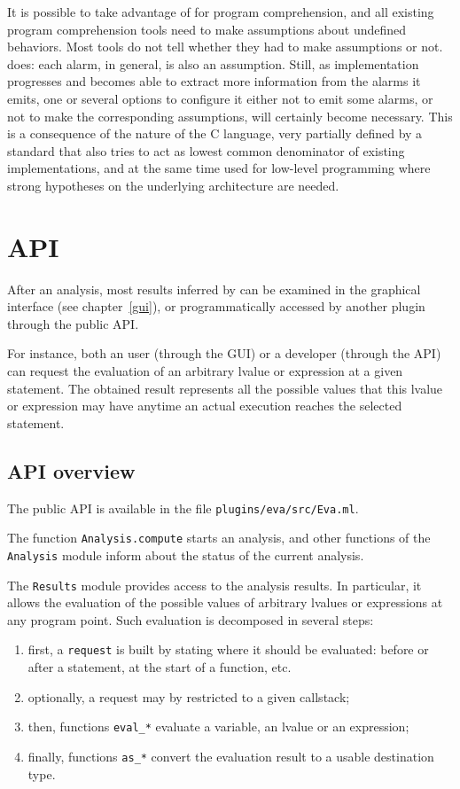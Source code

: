 \documentclass{frama-c-book}
\begin{document}
It is possible to take advantage of \Eva{}
for program comprehension, and all existing program comprehension
tools need to make assumptions about undefined behaviors. Most tools
do not tell whether they had to make assumptions or not.
\Eva{} does: each alarm, in general,
is also an assumption. Still, as implementation progresses
and \Eva{}
becomes able to extract more information from the alarms it emits,
one or several options
to configure it either not to emit some alarms, or not
to make the corresponding
assumptions, will certainly become necessary. This is a consequence
of the nature of the C language, very partially defined by a standard
that also tries to act as lowest common denominator of existing
implementations, and at the same time used for low-level programming
where strong hypotheses on the underlying architecture are needed.


\section{API}

After an analysis, most results inferred by \Eva{} can be examined in the
\FramaC graphical interface (see chapter \ref{gui}), or programmatically
accessed by another \FramaC plugin through the public \Eva{} API.

For instance, both an user (through the GUI) or a developer (through the API)
can request the evaluation of an arbitrary lvalue or expression at a given
statement.
The obtained result represents all the possible values that this lvalue or
expression may have anytime an actual execution reaches the selected statement.

\subsection{API overview}

The \Eva{} public API is available in the file \texttt{plugins/eva/src/Eva.ml}.

The function \lstinline|Analysis.compute| starts an analysis, and other
functions of the \lstinline|Analysis| module inform about the status of the
current analysis.

The \lstinline|Results| module provides access to the analysis results.
In particular, it allows the evaluation of the possible values of
arbitrary lvalues or expressions at any program point.
Such evaluation is decomposed in several steps:
\begin{enumerate}
\item first, a \lstinline|request| is built by stating where it should be
  evaluated: before or after a statement, at the start of a function, etc.
\item optionally, a request may by restricted to a given callstack;
\item then, functions \lstinline|eval_*| evaluate a variable, an lvalue or an
  expression;
\item finally, functions \lstinline|as_*| convert the evaluation result to a
  usable destination type.
\end{enumerate}
\end{document}
